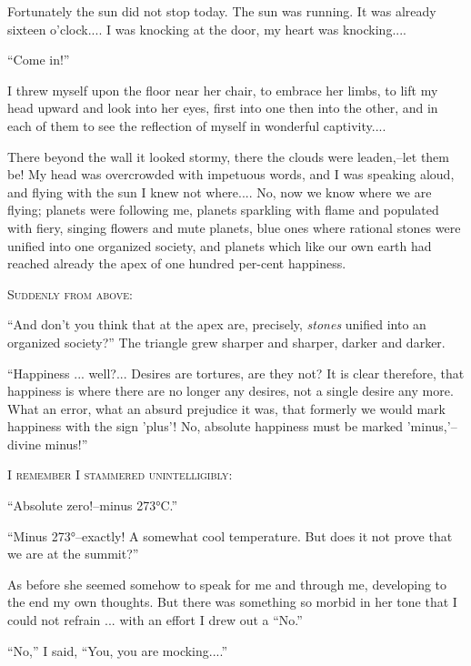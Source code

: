 \documentclass[11pt,openany]{book}
\begin{document}
Fortunately the sun did not stop today. The sun was running. It was already sixteen o'clock.... I was knocking at the door, my heart was knocking....

``Come in!''

I threw myself upon the floor near her chair, to embrace her limbs, to lift my head upward and look into her eyes, first into one then into the other, and in each of them to see the reflection of myself in wonderful captivity....

There beyond the wall it looked stormy, there the clouds were leaden,--let them be! My head was overcrowded with impetuous words, and I was speaking aloud, and flying with the sun I knew not where.... No, now we know where we are flying; planets were following me, planets sparkling with flame and populated with fiery, singing flowers and mute planets, blue ones where rational stones were unified into one organized society, and planets which like our own earth had reached already the apex of one hundred per-cent happiness.

\begin{center}\textsc{Suddenly from above:}\end{center}

``And don't you think that at the apex are, precisely, \emph{stones} unified into an organized society?'' The triangle grew sharper and sharper, darker and darker.

``Happiness ... well?... Desires are tortures, are they not? It is clear therefore, that happiness is where there are no longer any desires, not a single desire any more. What an error, what an absurd prejudice it was, that formerly we would mark happiness with the sign 'plus'! No, absolute happiness must be marked 'minus,'--divine minus!''

\begin{center}\textsc{I remember I stammered unintelligibly:}\end{center}

``Absolute zero!--minus 273°C.''

``Minus 273°--exactly! A somewhat cool temperature. But does it not prove that we are at the summit?''

As before she seemed somehow to speak for me and through me, developing to the end my own thoughts. But there was something so morbid in her tone that I could not refrain ... with an effort I drew out a ``No.''

``No,'' I said, ``You, you are mocking....''
\end{document}
